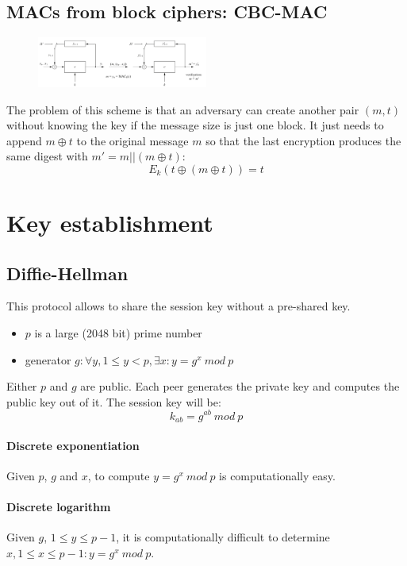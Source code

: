 \documentclass[a4paper,12pt]{article}
\begin{document}
\subsection{MACs from block ciphers: CBC-MAC}
\begin{figure}[H]
  \centering
  \includegraphics[width=0.5\textwidth]{img/cbc-mac}
\end{figure}
The problem of this scheme is that an adversary can create another pair $(m,t)$ without knowing the key if the message size is just one block.
It just needs to append $m \oplus t$ to the original message $m$ so that the last encryption produces the same digest with $m' = m||(m \oplus t)$:
$$ E_k(t \oplus (m \oplus t)) = t $$

\section{Key establishment}
\subsection{Diffie-Hellman}
This protocol allows to share the session key without a pre-shared key.
\begin{itemize}
	\item $p$ is a large (2048 bit) prime number
	\item generator $g : \forall y, 1 \leq y < p, \exists x : y = g^x\ mod\ p$
\end{itemize}
Either $p$ and $g$ are public. Each peer generates the private key and computes the public key out of it. The session key will be:
$$ k_{ab} = g^{ab}\ mod\ p $$

\paragraph{Discrete exponentiation}
Given $p$, $g$ and $x$, to compute $y = g^x\ mod\ p$ is computationally easy.

\paragraph{Discrete logarithm}
Given $g$, $1 \leq y \leq p-1$, it is computationally difficult to determine $x, 1 \leq x \leq p-1 : y = g^x\ mod\ p$.
\end{document}
